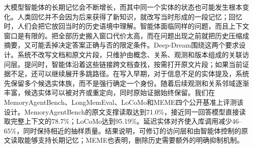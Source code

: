 大模型智能体的长期记忆会不断增长，而其中同一个实体的状态也可能发生根本变化。人类回忆并不会因为后来获得了新知识，就改写当时形成的一段记忆；回忆时，人们会把它放回当时的历史语境中理解。智能体面临同样的问题，而且上下文窗口是有限的。把全部历史搬入窗口代价太高，而在问题出现之前就把历史压缩成摘要，又可能丢掉决定答案正确与否的限定条件。Deep-Dream围绕这两个要求设计。系统不改写文档和原文片段，只维护由概念、关系、观测和版本组成的关联访问层。提问时，智能体沿着这些链接跨文档查找，按需打开原文片段；如果当前证据不足，还可以继续展开多跳路径。在写入早期，对于信息不足的实体提及，系统先保留多个候选实体族，而不是强行确定一个身份。随着后续观测和关系邻域逐渐丰富，候选实体可以被对齐或重定向，同时原始证据始终保留。我们在MemoryAgentBench、LongMemEval、LoCoMo和MEME四个公开基准上评测该设计。MemoryAgentBench的原文支撑读取达到71.0\%，接近同一回答模型直接读取完整上下文的78.7\%；LoCoMo达到95.19\%。延迟实体对齐使入库调用减少46--65\%，同时保持相近的抽样质量。结果说明，可修订的访问层和由智能体控制的原文读取能够支持长期记忆；MEME也表明，删除历史需要额外的明确抑制机制。
